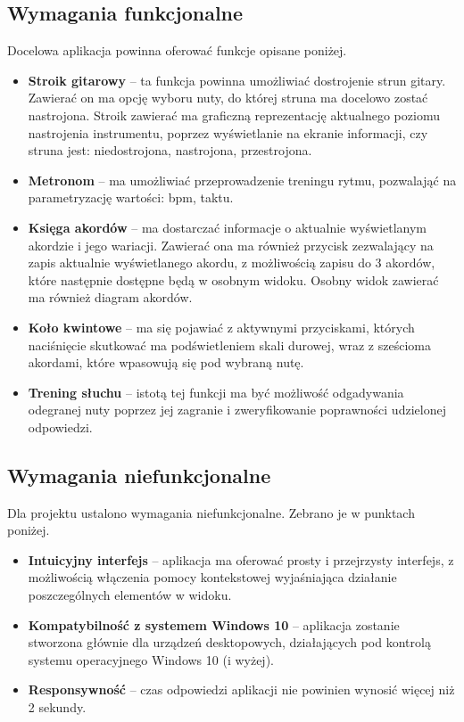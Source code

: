 \subsection{Wymagania funkcjonalne}
Docelowa aplikacja powinna oferować funkcje opisane poniżej.
\begin{itemize}
\item \textbf{Stroik gitarowy} -- ta funkcja powinna umożliwiać dostrojenie strun gitary. Zawierać on ma opcję wyboru nuty, do której struna ma docelowo zostać nastrojona. Stroik zawierać ma graficzną reprezentację aktualnego poziomu nastrojenia instrumentu, poprzez wyświetlanie na ekranie informacji, czy struna jest: niedostrojona, nastrojona, przestrojona.
\item \textbf{Metronom} -- ma umożliwiać przeprowadzenie treningu rytmu, pozwalająć na parametryzację wartości: bpm, taktu.
\item \textbf{Księga akordów} -- ma dostarczać informacje o aktualnie wyświetlanym akordzie i jego wariacji. Zawierać ona ma również przycisk zezwalający na zapis aktualnie wyświetlanego akordu, z możliwością zapisu do 3 akordów, które następnie dostępne będą w osobnym widoku. Osobny widok zawierać ma również diagram akordów.
\item \textbf{Koło kwintowe} -- ma się pojawiać z aktywnymi przyciskami, których naciśnięcie skutkować ma podświetleniem skali durowej, wraz z sześcioma akordami, które wpasowują się pod wybraną nutę.
\item \textbf{Trening słuchu} -- istotą tej funkcji ma być możliwość odgadywania odegranej nuty poprzez jej zagranie i zweryfikowanie poprawności udzielonej odpowiedzi. 
\end{itemize}

\subsection{Wymagania niefunkcjonalne}

Dla projektu ustalono wymagania niefunkcjonalne. Zebrano je w punktach poniżej.
\begin{itemize}
\item \textbf{Intuicyjny interfejs} -- aplikacja ma oferować prosty i przejrzysty interfejs, z możliwością włączenia pomocy kontekstowej wyjaśniająca działanie poszczególnych elementów w widoku.
\item \textbf{Kompatybilność z systemem Windows 10} --  aplikacja zostanie stworzona głównie dla urządzeń desktopowych, działających pod kontrolą systemu operacyjnego Windows 10 (i wyżej).
\item \textbf{Responsywność} -- czas odpowiedzi aplikacji nie powinien wynosić więcej niż 2 sekundy. 
\end{itemize}


